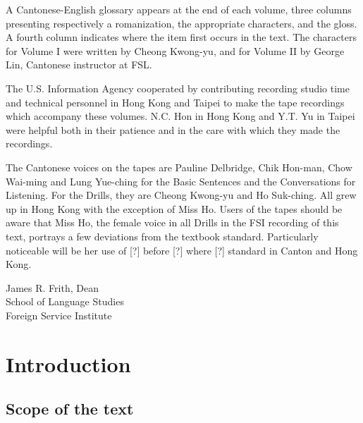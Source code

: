 A Cantonese-English glossary appears at the end of each volume, three columns presenting respectively a romanization, the appropriate characters, and the gloss. A fourth column indicates where the item first occurs in the text. The characters for Volume I were written by Cheong Kwong-yu, and for Volume II by George Lin, Cantonese instructor at FSL.

The U.S. Information Agency cooperated by contributing recording studio time and technical personnel in Hong Kong and Taipei to make the tape recordings which accompany these volumes. N.C. Hon in Hong Kong and Y.T. Yu in Taipei were helpful both in their patience and in the care with which they made the recordings.

The Cantonese voices on the tapes are Pauline Delbridge, Chik Hon-man, Chow Wai-ming and Lung Yue-ching for the Basic Sentences and the Conversations for Listening. For the Drills, they are Cheong Kwong-yu and Ho Suk-ching. All grew up in Hong Kong with the exception of Miss Ho. Users of the tapes should be aware that Miss Ho, the female voice in all Drills in the FSI recording of this text, portrays a few deviations from the textbook standard. Particularly noticeable will be her use of [?] before [?] where [?] standard in Canton and Hong Kong.


\begin{flushright}
James R. Frith, Dean\\
School of Language Studies\\
Foreign Service Institute\\
\end{flushright}

\newpage
\section{Introduction}


\subsection{Scope of the text}

